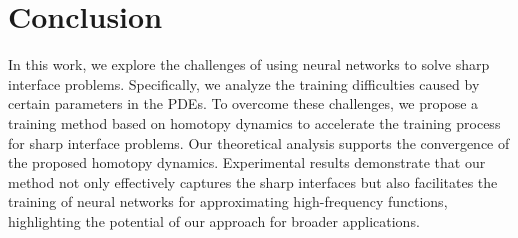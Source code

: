 \section{Conclusion}

In this work, we explore the challenges of using neural networks to solve sharp interface problems. Specifically, we analyze the training difficulties caused by certain parameters in the PDEs. To overcome these challenges, we propose a training method based on homotopy dynamics to accelerate the training process for sharp interface problems. Our theoretical analysis supports the convergence of the proposed homotopy dynamics. Experimental results demonstrate that our method not only effectively captures the sharp interfaces but also facilitates the training of neural networks for approximating high-frequency functions, highlighting the potential of our approach for broader applications.




